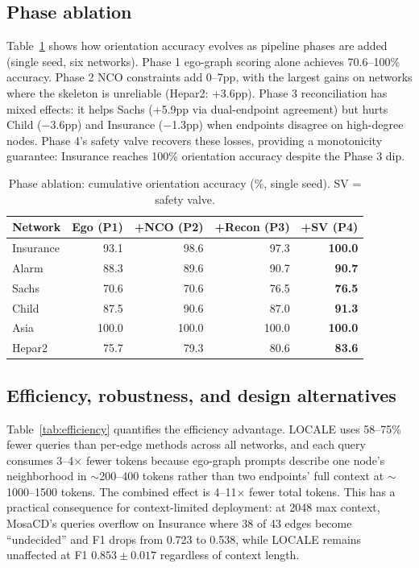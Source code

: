 \documentclass{article} %
\begin{document}
\subsection{Phase ablation}

Table~\ref{tab:ablation} shows how orientation accuracy evolves as pipeline phases are added (single seed, six networks). Phase 1 ego-graph scoring alone achieves 70.6--100\% accuracy. Phase 2 NCO constraints add 0--7pp, with the largest gains on networks where the skeleton is unreliable (Hepar2: +3.6pp). Phase 3 reconciliation has mixed effects: it helps Sachs (+5.9pp via dual-endpoint agreement) but hurts Child ($-$3.6pp) and Insurance ($-$1.3pp) when endpoints disagree on high-degree nodes. Phase 4's safety valve recovers these losses, providing a monotonicity guarantee: Insurance reaches 100\% orientation accuracy despite the Phase 3 dip.

\begin{table}[t]
\centering
\caption{Phase ablation: cumulative orientation accuracy (\%, single seed). SV = safety valve.}
\label{tab:ablation}
\small
\begin{tabular}{lrrrr}
\toprule
Network & Ego (P1) & +NCO (P2) & +Recon (P3) & +SV (P4) \\
\midrule
Insurance & 93.1 & 98.6 & 97.3 & \textbf{100.0} \\
Alarm     & 88.3 & 89.6 & 90.7 & \textbf{90.7} \\
Sachs     & 70.6 & 70.6 & 76.5 & \textbf{76.5} \\
Child     & 87.5 & 90.6 & 87.0 & \textbf{91.3} \\
Asia      & 100.0 & 100.0 & 100.0 & \textbf{100.0} \\
Hepar2    & 75.7 & 79.3 & 80.6 & \textbf{83.6} \\
\bottomrule
\end{tabular}
\end{table}

\subsection{Efficiency, robustness, and design alternatives}

Table~\ref{tab:efficiency} quantifies the efficiency advantage. LOCALE uses 58--75\% fewer queries than per-edge methods across all networks, and each query consumes 3--4$\times$ fewer tokens because ego-graph prompts describe one node's neighborhood in $\sim$200--400 tokens rather than two endpoints' full context at $\sim$1000--1500 tokens. The combined effect is 4--11$\times$ fewer total tokens. This has a practical consequence for context-limited deployment: at 2048 max context, MosaCD's queries overflow on Insurance where 38 of 43 edges become ``undecided'' and F1 drops from 0.723 to 0.538, while LOCALE remains unaffected at F1 $0.853 \pm 0.017$ regardless of context length.
\end{document}
